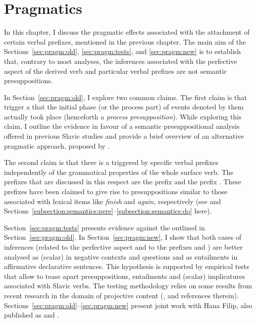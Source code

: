 \chapter{Pragmatics} %
\label{Chapter6}
In this chapter, I discuss the pragmatic effects associated with the attachment of certain verbal prefixes, mentioned in the previous chapter. The main aim of the Sections~\ref{sec:pragm:old}, \ref{sec:pragm:tests}, and \ref{sec:pragm:new} is to establish that, contrary to most analyses, the inferences associated with the perfective aspect of the derived verb and particular verbal prefixes are not semantic presuppositions. 

In Section~\ref{sec:pragm:old}, I explore two common claims. The first claim is that  trigger a  that the initial phase (or the process part) of events denoted by them actually took place (henceforth a \textit{process presupposition}). While exploring this claim, I outline the evidence in favour of a semantic presuppositional analysis offered in previous Slavic studies and provide a brief overview of an alternative pragmatic approach, proposed by \citet{Gronn:04, Gronn:06}.

The second claim is that there is a  triggered by specific verbal prefixes independently of the grammatical properties of the whole surface verb. The prefixes that are discussed in this respect are the  prefix  and the  prefix . These prefixes have been claimed to give rise to presuppositions similar to those associated with lexical items like \textit{finish} and \textit{again}, respectively (see \citealt{Kagan:book} and Sections~\ref{subsection:semantics:pere}--\ref{subsection:semantics:do} here).

Section~\ref{sec:pragm:tests} presents evidence against the  outlined in Section~\ref{sec:pragm:old}. In Section~\ref{sec:pragm:new}, I show that both cases of inferences (related to the perfective aspect and to the prefixes  and ) are better analysed as (scalar)  in negative contexts and questions and as entailments in affirmative declarative sentences. This hypothesis is supported by empirical tests that allow to tease apart presuppositions, entailments and (scalar) implicatures associated with Slavic verbs. The testing methodology relies on some results from recent research in the domain of projective content (\citealp{Schlenker:08, Chemla:09, Romoli:11}, and references therein). Sections~\ref{sec:pragm:old}--\ref{sec:pragm:new} present joint work with Hana Filip, also published as \citealt{ZinovaFilip:SALT} and \citealt{ZinovaFilip:14}. %

